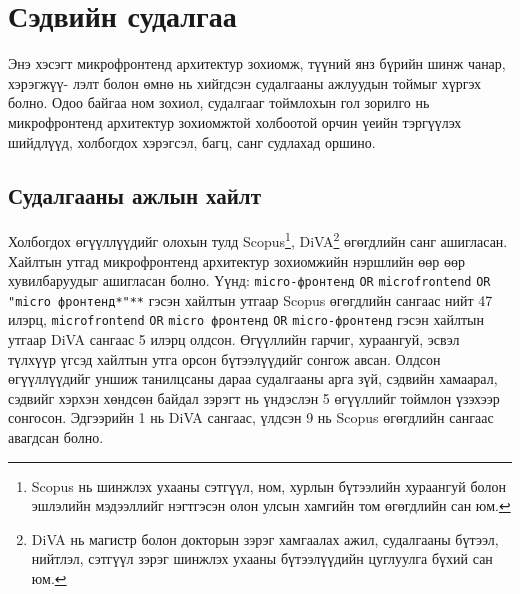 \section{Сэдвийн судалгаа}
\label{sec:literature-review}
Энэ хэсэгт микрофронтенд архитектур зохиомж, түүний янз бүрийн шинж чанар, хэрэгжүү- лэлт болон өмнө нь хийгдсэн судалгааны ажлуудын тоймыг хүргэх болно. Одоо байгаа ном зохиол, судалгааг тоймлохын гол зорилго нь микрофронтенд архитектур зохиомжтой холбоотой орчин үеийн тэргүүлэх шийдлүүд,  холбогдох хэрэгсэл, багц, санг судлахад оршино.
\subsection{Судалгааны ажлын хайлт}
\hspace*{1cm}Холбогдох өгүүллүүдийг олохын тулд Scopus\footnote{Scopus нь шинжлэх ухааны сэтгүүл, ном, хурлын бүтээлийн хураангуй болон эшлэлийн мэдээллийг нэгтгэсэн олон улсын хамгийн том өгөгдлийн сан юм.}, DiVA\footnote{DiVA нь магистр болон докторын зэрэг хамгаалах ажил, судалгааны бүтээл, нийтлэл, сэтгүүл зэрэг шинжлэх ухааны бүтээлүүдийн цуглуулга бүхий сан юм.} өгөгдлийн санг ашигласан. Хайлтын утгад микрофронтенд архитектур зохиомжийн нэршлийн өөр өөр хувилбаруудыг ашигласан болно. Үүнд: \verb|micro-фронтенд| \verb|OR| \verb|microfrontend| \verb|OR| \verb|"micro фронтенд*"**| гэсэн хайлтын утгаар Scopus өгөгдлийн сангаас нийт 47 илэрц, \verb|microfrontend| \verb|OR| \verb|micro фронтенд| \verb|OR| \verb|micro-фронтенд| гэсэн хайлтын утгаар DiVA сангаас 5 илэрц олдсон. Өгүүллийн гарчиг, хураангуй, эсвэл түлхүүр үгсэд хайлтын утга орсон бүтээлүүдийг сонгож авсан. Олдсон өгүүллүүдийг уншиж танилцсаны дараа судалгааны арга зүй, сэдвийн хамаарал, сэдвийг хэрхэн хөндсөн байдал зэрэгт нь үндэслэн 5 өгүүллийг тоймлон үзэхээр сонгосон. Эдгээрийн 1 нь DiVA сангаас, үлдсэн 9 нь Scopus өгөгдлийн сангаас авагдсан болно.

